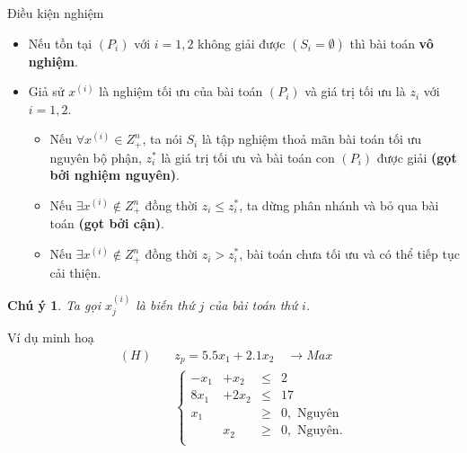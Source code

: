 \documentclass[10pt]{beamer}
\newtheorem{cy}{Chú ý}[section]
\begin{document}
\begin{frame}{Điều kiện nghiệm}
\begin{itemize}
\item Nếu tồn tại $(P_i)$ với $i=1,2$ không giải được $(S_i = \emptyset )$ thì bài toán \textbf{vô nghiệm}.
\medskip
\item Giả sử $x^{(i)}$ là nghiệm tối ưu của bài toán $(P_i)$ và giá trị tối ưu là $z_i$ với $i = 1,2$.
\begin{itemize}
\item Nếu $\forall x^{(i)} \in Z^n_+$, ta nói $S_i$ là tập nghiệm thoả mãn bài toán tối ưu nguyên bộ phận, $z^*_i$ là giá trị tối ưu và bài toán con $(P_i)$ được giải \textbf{(gọt bởi nghiệm nguyên)}.
\item Nếu $\exists x^{(i)} \notin Z^n_+$ đồng thời $z_i \leq z^*_i$, ta dừng phân nhánh và bỏ qua bài toán \textbf{(gọt bởi cận)}.
\item Nếu $\exists x^{(i)} \notin Z^n_+$ đồng thời $z_i > z^*_i$, bài toán chưa tối ưu và có thể tiếp tục cải thiện.
\end{itemize}
\end{itemize}
\medskip
\begin{cy}
Ta gọi $x_j^{(i)}$ là biến thứ $j$ của bài toán thứ $i$.
\end{cy}
\end{frame}

\begin{frame}{Ví dụ minh hoạ}
    \begin{equation*}
        \begin{split}
            (H) \quad &z_p= 5.5x_1 + 2.1x_2 \quad \longrightarrow Max \\
            & \left\{\begin{array}{cccc}
            -x_1 &+ x_2 &\leq& 2 \\
            8x_1 &+ 2x_2 &\leq& 17 \\
            x_1 &&\geq& 0, \text{ Nguyên}\\
            &x_2 &\geq& 0, \text{ Nguyên}. \\
            \end{array}\right. \\
        \end{split}
    \end{equation*}
\end{frame}
\end{document}
